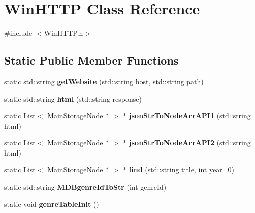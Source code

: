 \hypertarget{class_win_h_t_t_p}{}\section{Win\+H\+T\+TP Class Reference}
\label{class_win_h_t_t_p}


{\ttfamily \#include $<$Win\+H\+T\+T\+P.\+h$>$}

\subsection*{Static Public Member Functions}
\begin{DoxyCompactItemize}
\item 
\mbox{\label{class_win_h_t_t_p_a85e23c7eee92f8841fb25e9e449cfee1}} 
static std\+::string {\bfseries get\+Website} (std\+::string host, std\+::string path)
\item 
\mbox{\label{class_win_h_t_t_p_a37afa3b3fdb8e4172af39d6fd729442d}} 
static std\+::string {\bfseries html} (std\+::string response)
\item 
\mbox{\label{class_win_h_t_t_p_a8a641711c76305722b338098930a23ee}} 
static \hyperlink{class_list}{List}$<$ \hyperlink{class_main_storage_node}{Main\+Storage\+Node} $\ast$ $>$ $\ast$ {\bfseries json\+Str\+To\+Node\+Arr\+A\+P\+I1} (std\+::string html)
\item 
\mbox{\label{class_win_h_t_t_p_a970c8ab5296a3bce26c186d24cae512e}} 
static \hyperlink{class_list}{List}$<$ \hyperlink{class_main_storage_node}{Main\+Storage\+Node} $\ast$ $>$ $\ast$ {\bfseries json\+Str\+To\+Node\+Arr\+A\+P\+I2} (std\+::string html)
\item 
\mbox{\label{class_win_h_t_t_p_a7b48b93aa3ff96af695b079bf89d580e}} 
static \hyperlink{class_list}{List}$<$ \hyperlink{class_main_storage_node}{Main\+Storage\+Node} $\ast$ $>$ $\ast$ {\bfseries find} (std\+::string title, int year=0)
\item 
\mbox{\label{class_win_h_t_t_p_aeeacd2ab2b54f3101353679eba482fe9}} 
static std\+::string {\bfseries M\+D\+Bgenre\+Id\+To\+Str} (int genre\+Id)
\item 
\mbox{\label{class_win_h_t_t_p_acf98fc4a9b0a84edcbf4b5732a47655f}} 
static void {\bfseries genre\+Table\+Init} ()
\end{DoxyCompactItemize}



